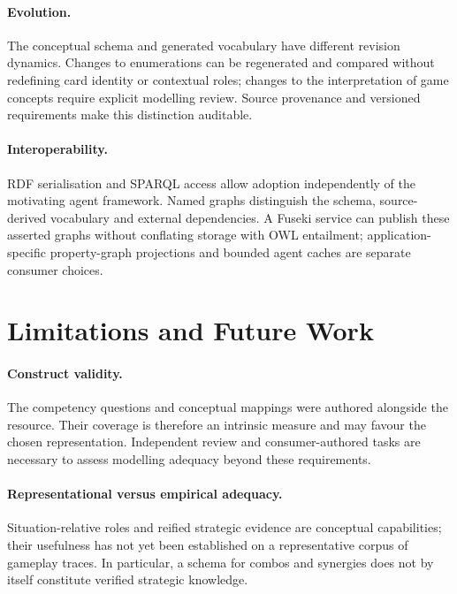 \documentclass[11pt,a4paper]{article}
\begin{document}
\paragraph{Evolution.} The conceptual schema and generated vocabulary have different revision dynamics. Changes to enumerations can be regenerated and compared without redefining card identity or contextual roles; changes to the interpretation of game concepts require explicit modelling review. Source provenance and versioned requirements make this distinction auditable.

\paragraph{Interoperability.} RDF serialisation and SPARQL access allow adoption independently of the motivating agent framework. Named graphs distinguish the schema, source-derived vocabulary and external dependencies. A Fuseki service can publish these asserted graphs without conflating storage with OWL entailment; application-specific property-graph projections \citep{neo4j_n10s} and bounded agent caches are separate consumer choices.

\section{Limitations and Future Work}
\label{sec:limits}

\paragraph{Construct validity.} The competency questions and conceptual mappings were authored alongside the resource. Their coverage is therefore an intrinsic measure and may favour the chosen representation. Independent review and consumer-authored tasks are necessary to assess modelling adequacy beyond these requirements.

\paragraph{Representational versus empirical adequacy.} Situation-relative roles and reified strategic evidence are conceptual capabilities; their usefulness has not yet been established on a representative corpus of gameplay traces. In particular, a schema for combos and synergies does not by itself constitute verified strategic knowledge.
\end{document}
